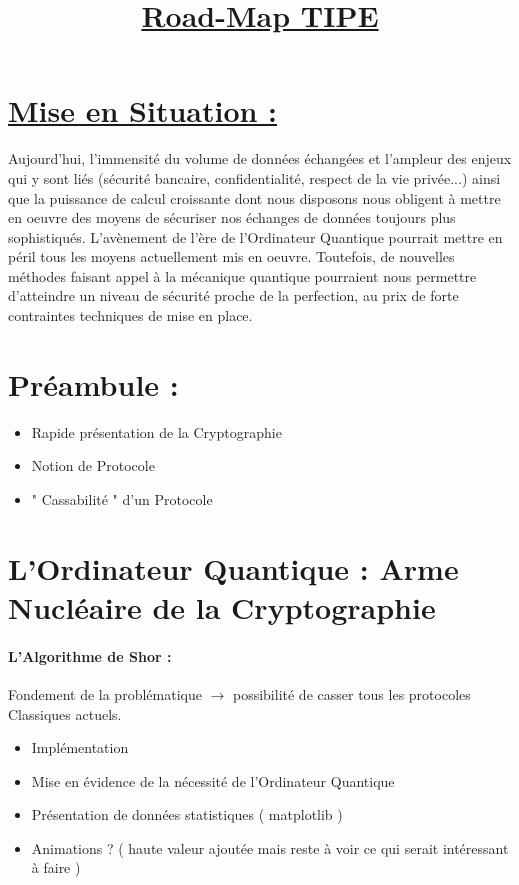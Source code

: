 \documentclass{article}
\title{\textbf{\underline{Road-Map TIPE}}}
\author{}
\date{}
\begin{document}
\maketitle

\section*{\underline{Mise en Situation :}}
Aujourd'hui, l'immensité du volume de données échangées et l'ampleur des enjeux qui y sont liés (sécurité bancaire, confidentialité, respect de la vie privée...) ainsi que la puissance de calcul croissante  dont nous disposons nous obligent à mettre en oeuvre des moyens de sécuriser nos échanges de données toujours plus sophistiqués. L'avènement de l'ère de l'Ordinateur Quantique pourrait mettre en péril tous les moyens actuellement mis en oeuvre. Toutefois, de nouvelles méthodes faisant appel à la mécanique quantique pourraient nous permettre d'atteindre un niveau de sécurité proche de la perfection, au prix de forte contraintes techniques de mise en place.

\section{Préambule :}

\begin{itemize}
    \item Rapide présentation de la Cryptographie
    \item Notion de Protocole
    \item " Cassabilité " d'un Protocole
\end{itemize}

\section{L'Ordinateur Quantique : Arme Nucléaire de la Cryptographie}

\paragraph{L'Algorithme de Shor :} Fondement de la problématique $\rightarrow$ possibilité de casser tous les protocoles Classiques actuels.

\begin{itemize}
    \item Implémentation 
    \item Mise en évidence de la nécessité de l'Ordinateur Quantique
    \item Présentation de données statistiques ( matplotlib )
    \item Animations ? ( haute valeur ajoutée mais reste à voir ce qui serait intéressant à faire )
\end{itemize}
    
\end{document}
